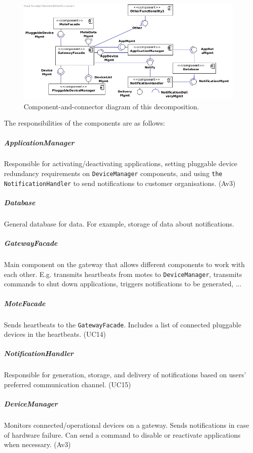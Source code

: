         \begin{figure}[!htp]
        	\centering
        	\includegraphics[width=1.00\textwidth]{images/component-diagram-1}
        	\caption{Component-and-connector diagram of this decomposition.}
            \label{fig:it1-cc_main}
        \end{figure}

        The responsibilities of the components are as follows:

    \subparagraph{ApplicationManager}
        Responsible for activating/deactivating applications, setting
        pluggable device redundancy requirements on \texttt{DeviceManager}
        components, and using \texttt{the NotificationHandler} to send notifications
        to customer organisations. (Av3)

    \subparagraph{Database}
        General database for data. For example, storage of data
        about notifications.

    \subparagraph{GatewayFacade}
        Main component on the gateway that allows different components to work
        with each other. E.g. transmits heartbeats from motes to
        \texttt{DeviceManager}, transmits commands to shut down applications,
        triggers notifications to be generated, ...

    \subparagraph{MoteFacade}
        Sends heartbeats to the \texttt{GatewayFacade}. Includes a list
        of connected pluggable devices in the heartbeats. (UC14)

    \subparagraph{NotificationHandler}
        Responsible for generation, storage, and delivery of notifications
        based on users' preferred communication channel. (UC15)

    \subparagraph{DeviceManager}
        Monitors connected/operational devices on a gateway. Sends notifications
        in case of hardware failure. Can send a command to disable or reactivate
        applications when necessary. (Av3)

